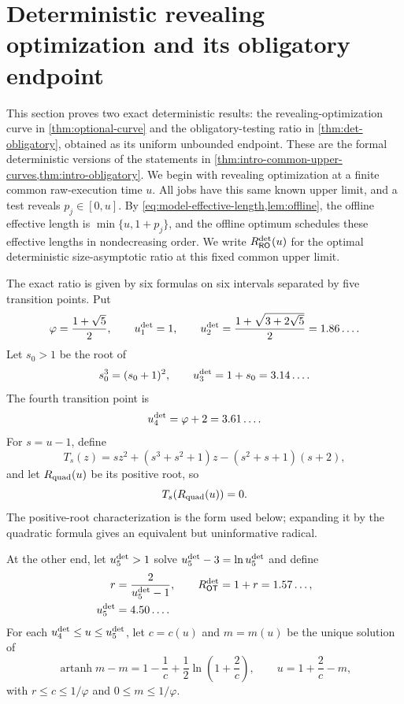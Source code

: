 \section{Deterministic revealing optimization and its obligatory endpoint}
\label{sec:optional}

This section proves two exact deterministic results: the revealing-optimization
curve in \cref{thm:optional-curve} and the obligatory-testing ratio in
\cref{thm:det-obligatory}, obtained as its uniform unbounded endpoint.  These
are the formal deterministic versions of the statements in
\cref{thm:intro-common-upper-curves,thm:intro-obligatory}.  We begin with
revealing optimization at a finite common raw-execution time $u$.  All jobs
have this same known upper limit, and a
test reveals $p_j\in[0,u]$.  By
\cref{eq:model-effective-length,lem:offline}, the offline effective length
is $\min\{u,1+p_j\}$, and the offline optimum schedules these
effective lengths in nondecreasing order.  We write $R_{\mathsf{RO}}^{\mathrm{det}}(u)$ for the optimal
deterministic size-asymptotic ratio at this fixed common upper limit.

The exact ratio is given by six formulas on six intervals separated by five
transition points.  Put
\begin{equation}
 \varphi=\frac{1+\sqrt5}{2},
 \qquad
 u_{1}^{\mathrm{det}}=1,
 \qquad
 u_{2}^{\mathrm{det}}=\frac{1+\sqrt{3+2\sqrt5}}2
 =1.86\ldots .
 \label{eq:opt:u1-u2}
\end{equation}
Let $s_0>1$ be the root of
\begin{equation}
 s_0^3=(s_0+1)^2,
 \qquad
 u_{3}^{\mathrm{det}}=1+s_0=3.14\ldots .
 \label{eq:opt:u3}
\end{equation}
The fourth transition point is
\begin{equation}
 u_{4}^{\mathrm{det}}=\varphi+2=3.61\ldots .
 \label{eq:opt:u4}
\end{equation}
For $s=u-1$, define
\[
 T_s(z)=sz^2+(s^3+s^2+1)z-(s^2+s+1)(s+2),
\]
and let $R_{\mathrm{quad}}(u)$ be its positive root, so
\begin{equation}
 T_s(R_{\mathrm{quad}}(u))=0.
 \label{eq:opt:Rquad-equation}
\end{equation}
The positive-root characterization is the form used below; expanding it by
the quadratic formula gives an equivalent but uninformative radical.

At the other end, let $u_{5}^{\mathrm{det}}>1$ solve
$u_{5}^{\mathrm{det}}-3=\ln u_{5}^{\mathrm{det}}$ and define
\begin{equation}
 \begin{aligned}
  r&=\frac2{u_{5}^{\mathrm{det}}-1},
  \qquad
  R_{\mathsf{OT}}^{\mathrm{det}}=1+r=1.57\ldots,\\
  u_{5}^{\mathrm{det}}&=4.50\ldots .
 \end{aligned}
\label{eq:opt:obligatory-constant}
\end{equation}
For each $u_{4}^{\mathrm{det}}\le u\le u_{5}^{\mathrm{det}}$, let $c=c(u)$ and $m=m(u)$ be the
unique solution of
\begin{equation}
 \operatorname{artanh}m-m
 =1-\frac1c+\frac12\ln\!\left(1+\frac2c\right),
 \qquad
 u=1+\frac2c-m,
 \label{eq:opt:cm-parametrization}
\end{equation}
with $r\le c\le1/\varphi$ and $0\le m\le1/\varphi$.

